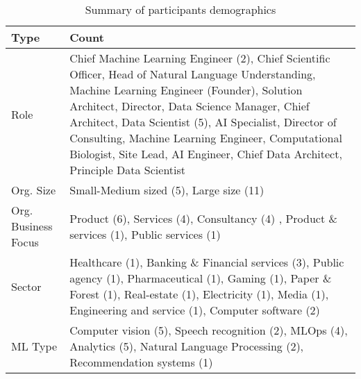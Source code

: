 \begin{table*}[h!]
  \centering
  \caption{Summary of participants demographics}
    \begin{tabular}{lp{12cm} }
    \toprule
    \textbf{Type} & \textbf{Count} \\
    \toprule
    Role & Chief Machine Learning Engineer (2), Chief Scientific Officer, Head of Natural Language Understanding,  Machine Learning Engineer (Founder), Solution Architect, Director, Data Science Manager, Chief Architect, Data Scientist (5), AI Specialist, Director of Consulting, Machine Learning Engineer, Computational Biologist, Site Lead, AI Engineer, Chief Data Architect, Principle Data Scientist \\
    \midrule

    Org. Size & Small-Medium sized (5),  Large size (11)\\
    \midrule

    Org. Business Focus & Product (6), Services (4), Consultancy (4) , Product \& services (1), Public services (1)\\
    \midrule

    Sector & Healthcare (1), Banking \& Financial services (3), Public agency (1), Pharmaceutical (1), Gaming (1), Paper \& Forest (1), Real-estate (1), Electricity (1), Media (1), Engineering and service (1), Computer software (2)\\
    \midrule

    ML Type & Computer vision (5), Speech recognition (2), MLOps (4), Analytics (5), Natural Language Processing (2), Recommendation systems (1)\\
    \bottomrule

    \end{tabular}%
  \label{tab:practioners}%
\end{table*}%




